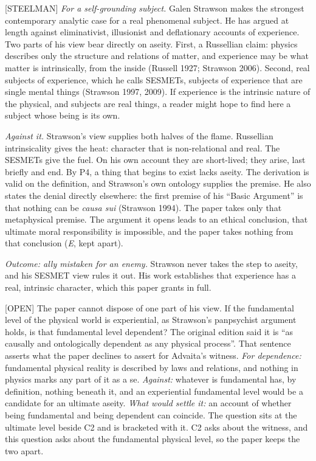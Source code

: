 \documentclass[11pt]{article}
\newcommand{\register}[1]{{\ttfamily\small #1}}
\begin{document}
\register{[STEELMAN]} \emph{For a self-grounding subject.} Galen Strawson makes the strongest contemporary analytic case for a real phenomenal subject. He has argued at length against eliminativist, illusionist and deflationary accounts of experience. Two parts of his view bear directly on aseity. First, a Russellian claim: physics describes only the structure and relations of matter, and experience may be what matter is intrinsically, from the inside (Russell 1927; Strawson 2006). Second, real subjects of experience, which he calls SESMETs, subjects of experience that are single mental things (Strawson 1997, 2009). If experience is the intrinsic nature of the physical, and subjects are real things, a reader might hope to find here a subject whose being is its own.

\emph{Against it.} Strawson's view supplies both halves of the flame. Russellian intrinsicality gives the heat: character that is non-relational and real. The SESMETs give the fuel. On his own account they are short-lived; they arise, last briefly and end. By P4, a thing that begins to exist lacks aseity. The derivation is valid on the definition, and Strawson's own ontology supplies the premise. He also states the denial directly elsewhere: the first premise of his ``Basic Argument'' is that nothing can be \emph{causa sui} (Strawson 1994). The paper takes only that metaphysical premise. The argument it opens leads to an ethical conclusion, that ultimate moral responsibility is impossible, and the paper takes nothing from that conclusion (\emph{E}, kept apart).

\emph{Outcome: ally mistaken for an enemy.} Strawson never takes the step to aseity, and his SESMET view rules it out. His work establishes that experience has a real, intrinsic character, which this paper grants in full.

\register{[OPEN]} The paper cannot dispose of one part of his view. If the fundamental level of the physical world is experiential, as Strawson's panpsychist argument holds, is that fundamental level dependent? The original edition said it is ``as causally and ontologically dependent as any physical process''. That sentence asserts what the paper declines to assert for Advaita's witness. \emph{For dependence:} fundamental physical reality is described by laws and relations, and nothing in physics marks any part of it as a se. \emph{Against:} whatever is fundamental has, by definition, nothing beneath it, and an experiential fundamental level would be a candidate for an ultimate aseity. \emph{What would settle it:} an account of whether being fundamental and being dependent can coincide. The question sits at the ultimate level beside C2 and is bracketed with it. C2 asks about the witness, and this question asks about the fundamental physical level, so the paper keeps the two apart.
\end{document}
